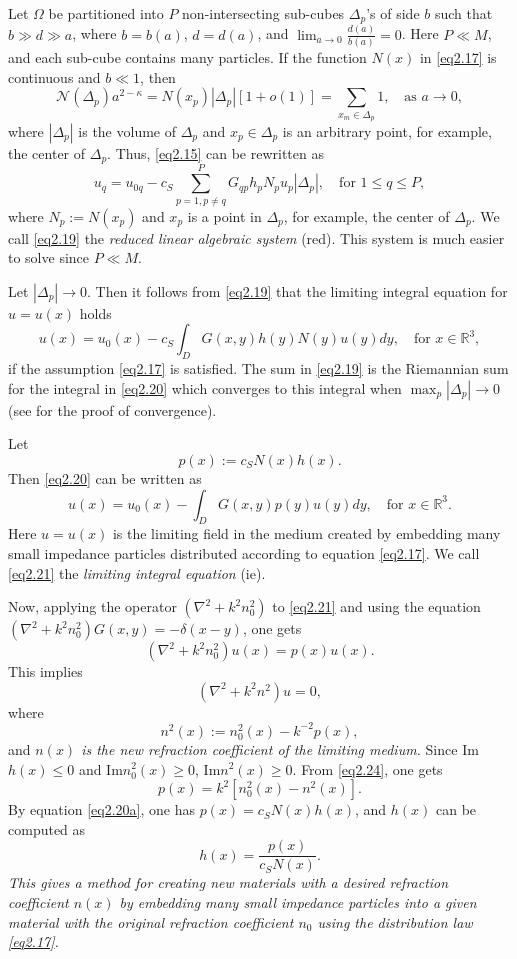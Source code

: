 \documentclass[12pt]{elsarticle}
\numberwithin{equation}{section}
\newcommand{\be}{\begin{equation}}
\newcommand{\ee}{\end{equation}}
\begin{document}
Let $\Omega$ be partitioned into $P$ non-intersecting sub-cubes $\Delta_p$'s of side $b$ such that $b \gg d \gg a$, where $b=b(a)$, $d=d(a)$, and $\lim_{a\to 0}\frac{d(a)}{b(a)}=0$. Here $P \ll M$,  and each sub-cube contains many particles.  If
the function $N(x)$  in \eqref{eq2.17} is continuous and $b \ll 1$, then
\be \label{eq2.18}
	\mathcal{N}(\Delta_p) a^{2-\kappa}=N(x_p)|\Delta_p|[1+o(1)]=\sum_{x_m \in \Delta_p}1, \quad\text{as } a \to 0,
\ee
where $|\Delta_p|$ is the volume of $\Delta_p$ and $x_p\in \Delta_p$ is an arbitrary point, for example, the center of $\Delta_p$.
Thus, \eqref{eq2.15} can be rewritten as
\be \label{eq2.19}
    u_q = u_{0q}-c_S\sum_{p=1, p \neq q}^P G_{qp} h_p N_p u_p |\Delta_p|, \quad\text{for } 1 \leq q \leq P,
\ee
where $N_p:=N(x_p)$ and $x_p$ is a point in $\Delta_p$, for example, the center of $\Delta_p$. We call \eqref{eq2.19} the \textit{reduced linear algebraic system} (red). This system is much easier to solve since $P \ll M$.

Let $|\Delta_p| \to 0$. Then it follows from \eqref{eq2.19} that the limiting integral equation for $u=u(x)$ holds
\be \label{eq2.20}
    u(x)=u_0(x)-c_S\int_D G(x,y)h(y)N(y)u(y)dy, \quad\text{for } x \in \mathbb{R}^3,
\ee
 if the assumption \eqref{eq2.17} is satisfied. The sum in \eqref{eq2.19} is the Riemannian sum for the integral in \eqref{eq2.20} which converges to this integral when $\max_{p}|\Delta_p|\to 0$ (see \cite{R635} for the proof of convergence).

Let
\be \label{eq2.20a}
	p(x):=c_SN(x)h(x).
\ee
Then \eqref{eq2.20} can be written as
\be \label{eq2.21}
    u(x)=u_0(x)-\int_D G(x,y)p(y)u(y)dy, \quad\text{for } x \in \mathbb{R}^3.
\ee
 Here $u=u(x)$ is the limiting field in the medium created by embedding many small impedance particles distributed according to
  equation \eqref{eq2.17}. We call \eqref{eq2.21} the \textit{limiting integral equation} (ie).

Now, applying the operator $(\nabla^2+k^2n_0^2)$ to \eqref{eq2.21} and using the equation $(\nabla^2+k^2n_0^2)G(x,y)=-\delta(x-y)$, one gets
\be  \label{eq2.22}
    (\nabla^2+k^2n_0^2)u(x)=p(x)u(x).
\ee
This implies
\be \label{eq2.23}
	(\nabla^2+k^2n^2)u=0,
\ee
where
\be \label{eq2.24}
	n^2(x):=n_0^2(x)-k^{-2}p(x),
\ee
and {\em  $n(x)$ is the new refraction coefficient of the limiting medium.}
 Since Im$h(x) \le 0$ and Im$n_0^2(x) \ge 0$, Im$n^2(x) \ge 0$. From \eqref{eq2.24}, one gets
\be \label{eq2.25}
	p(x)=k^2[n_0^2(x)-n^2(x)].
\ee
By equation \eqref{eq2.20a},  one has $p(x)=c_SN(x)h(x)$, and $h(x)$ can be computed as
\be \label{eq2.26}
	h(x)=\frac{p(x)}{c_SN(x)}.
\ee
{\em This gives  a method for creating new materials with a desired refraction coefficient $n(x)$ by embedding many small impedance particles into a given material with the original refraction coefficient $n_0$ using the distribution law \eqref{eq2.17}.}
\end{document}
